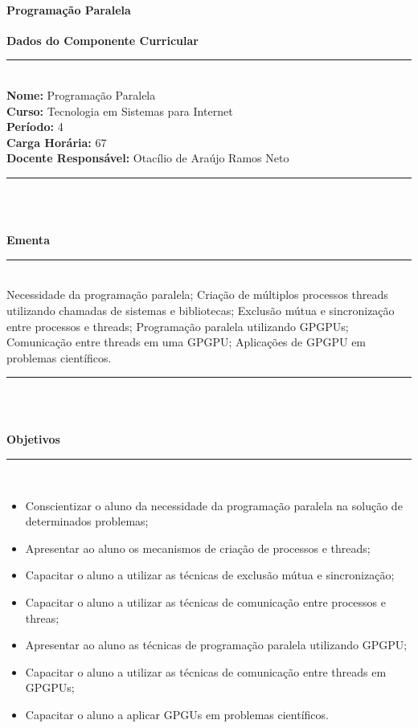 \paragraph{Programação Paralela}

\begin{center}\textbf{Dados do Componente Curricular}\end{center}
\vspace{-5mm}
\noindent\rule{16.5cm}{0.4pt}
\\
\textbf{Nome:} Programação Paralela
\\ 
\textbf{Curso:} Tecnologia em Sistemas para Internet
\\ 
\textbf{Período:} \unit{4}{\degree}
\\ 
\textbf{Carga Horária:} \unit{67}{\hour}
\\ 
\textbf{Docente Responsável:} Otacílio de Araújo Ramos Neto
\\ 
\noindent\rule{16.5cm}{0.4pt}\\
\\
\vspace{-12mm}
\begin{center}\textbf{Ementa}\end{center}
\vspace{-5mm}
\noindent\rule{16.5cm}{0.4pt}
\\
Necessidade da programação paralela; Criação de múltiplos processos threads utilizando chamadas de sistemas e bibliotecas; Exclusão mútua e sincronização entre processos e threads; Programação paralela utilizando GPGPUs; Comunicação entre threads em uma GPGPU; Aplicações de GPGPU em problemas científicos.\\ 
\noindent\rule{16.5cm}{0.4pt}\\
\\
\vspace{-12mm}
\begin{center}\textbf{Objetivos}\end{center}
\vspace{-5mm}
\noindent\rule{16.5cm}{0.4pt}
\\
\begin{itemize}
\item Conscientizar o aluno da necessidade da programação paralela na solução de determinados problemas;
\item Apresentar ao aluno os mecanismos de criação de processos e threads;
\item Capacitar o aluno a utilizar as técnicas de exclusão mútua e sincronização;
\item Capacitar o aluno a utilizar as técnicas de comunicação entre processos e threas;
\item Apresentar ao aluno as técnicas de programação paralela utilizando GPGPU;
\item Capacitar o aluno a utilizar as técnicas de comunicação entre threads em GPGPUs;
\item Capacitar o aluno a aplicar GPGUs em problemas científicos.
\end{itemize} 
